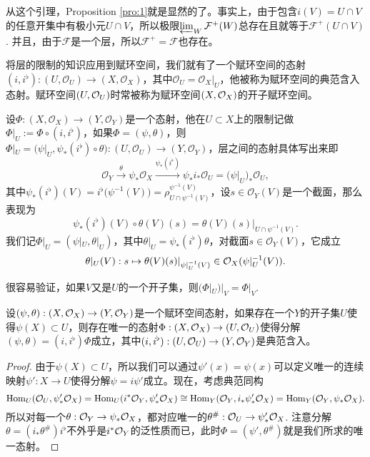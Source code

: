 从这个引理，Proposition \ref{pro:1}就是显然的了。事实上，由于包含$i(V)=U\cap V$的任意开集中有极小元$U\cap V$，所以极限$\varprojlim_W \mathcal{F}^+(W)$总存在且就等于$\mathcal{F}^+(U\cap V)$. 并且，由于$\mathcal{F}$是一个层，所以$\mathcal{F}^+=\mathcal{F}$也存在。

\begin{para}
将层的限制的知识应用到赋环空间，我们就有了一个赋环空间的态射$(i,i^\flat):(U,\mathcal{O}_U)\to (X,\mathcal{O}_X)$，其中$\mathcal{O}_U=\mathcal{O}_X|_U$，他被称为赋环空间的典范含入态射。赋环空间$(U,\mathcal{O}_U)$时常被称为赋环空间$(X,\mathcal{O}_X)$的开子赋环空间。

设$\Phi:(X,\mathcal{O}_X)\to (Y,\mathcal{O}_Y)$是一个态射，他在$U\subset X$上的限制记做$\Phi|_U:=\Phi\circ (i,i^\flat)$，如果$\Phi=(\psi,\theta)$，则$\Phi|_U=\bigl(\psi|_U, \psi_*(i^\flat) \circ \theta\bigr):(U,\mathcal{O}_U)\to (Y,\mathcal{O}_Y)$，层之间的态射具体写出来即
\[
	\mathcal{O}_Y\xrightarrow{\theta} \psi_*\mathcal{O}_X \xrightarrow{\psi_*(i^\flat)} \psi_*i_*\mathcal{O}_U=\bigl(\psi|_U\bigr)_*\mathcal{O}_U,
\]
其中$\psi_*(i^\flat)(V)=i^\flat\bigl(\psi^{-1}(V)\bigr)=\rho^{\psi^{-1}(V)}_{U\cap \psi^{-1}(V)}$，设$s\in \mathcal{O}_Y(V)$是一个截面，那么表现为
\[
	\psi_*(i^\flat)(V)\circ \theta(V)(s)=\theta(V)(s)|_{U\cap \psi^{-1}(V)}.
\]
我们记$\Phi|_U=(\psi|_U,\theta|_U)$，其中$\theta|_U=\psi_*(i^\flat)\theta$，对截面$s\in \mathcal{O}_Y(V)$，它成立
\[
	\theta|_U(V):s\mapsto \theta(V)(s)|_{\psi|_U^{-1}(V)}\in \mathcal{O}_X(\psi|_U^{-1}(V)).
\]

很容易验证，如果$V$又是$U$的一个开子集，则$(\Phi|_U)|_V=\Phi|_V$.
\end{para}

\begin{pro}\label{pro:1.20}
设$(\psi,\theta):(X,\mathcal{O}_X)\to (Y,\mathcal{O}_Y)$是一个赋环空间态射，如果存在一个$Y$的开子集$U$使得$\psi(X)\subset U$，则存在唯一的态射$\Phi:(X,\mathcal{O}_X)\to (U,\mathcal{O}_U)$使得分解$(\psi,\theta)=(i,i^\flat)\Phi$成立，其中$(i,i^\flat):(U,\mathcal{O}_U)\to (Y,\mathcal{O}_Y)$是典范含入。
\end{pro}

\begin{proof}
由于$\psi(X)\subset U$，所以我们可以通过$\psi'(x)=\psi(x)$可以定义唯一的连续映射$\psi':X\to U$使得分解$\psi=i\psi'$成立。现在，考虑典范同构
\[
	\operatorname{Hom}_{U}(\mathcal{O}_U,\psi'_*\mathcal{O}_X)=\operatorname{Hom}_{U}(i^*\mathcal{O}_Y,\psi'_*\mathcal{O}_X)\cong \operatorname{Hom}_{Y}(\mathcal{O}_Y,i_*\psi'_*\mathcal{O}_X)=\operatorname{Hom}_{Y}(\mathcal{O}_Y,\psi_*\mathcal{O}_X).
\]
所以对每一个$\theta:\mathcal{O}_Y\to \psi_*\mathcal{O}_X$，都对应唯一的$\theta^\#:\mathcal{O}_U\to \psi'_*\mathcal{O}_X$. 注意分解$\theta=(i_*\theta^\#)i^\flat$不外乎是$i^*\mathcal{O}_Y$的泛性质而已，此时$\Phi=(\psi',\theta^\#)$就是我们所求的唯一态射。
\end{proof}

